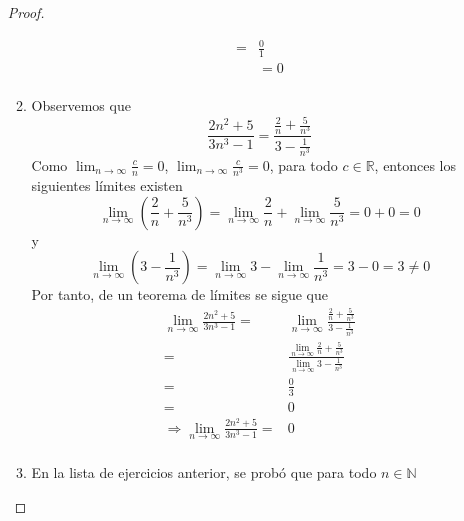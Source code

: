 \documentclass[12pt]{article}
\begin{document}
\begin{enumerate}
\begin{proof}
\begin{enumerate}
\begin{equation*}
\begin{split}
                        =&\frac{0}{1}\\
                        &=0\\
                    \end{split}
                \end{equation*}
                \item Observemos que
                \begin{equation*}
                    \frac{2n^2+5}{3n^3-1}=\frac{\frac{2}{n}+\frac{5}{n^3}}{3-\frac{1}{n^3}}
                \end{equation*}
                Como $\lim_{n\rightarrow\infty}\frac{c}{n}=0$, $\lim_{n\rightarrow\infty}\frac{c}{n^3}=0$, para todo $c\in\mathbb{R}$, entonces los siguientes límites existen
                \begin{equation*}
                    \lim_{n\rightarrow\infty}\left(\frac{2}{n}+\frac{5}{n^3}\right)=\lim_{n\rightarrow\infty}\frac{2}{n}+\lim_{n\rightarrow\infty}\frac{5}{n^3}=0+0=0
                \end{equation*}
                y
                \begin{equation*}
                    \lim_{n\rightarrow\infty}\left(3-\frac{1}{n^3}\right)=\lim_{n\rightarrow\infty}3-\lim_{n\rightarrow\infty}\frac{1}{n^3}=3-0=3\neq0
                \end{equation*}
                Por tanto, de un teorema de límites se sigue que
                \begin{equation*}
                    \begin{split}
                        \lim_{n\rightarrow\infty}\frac{2n^2+5}{3n^3-1}=&\lim_{n\rightarrow\infty}\frac{\frac{2}{n}+\frac{5}{n^3}}{3-\frac{1}{n^3}}\\
                        =&\frac{\lim_{n\rightarrow\infty}\frac{2}{n}+\frac{5}{n^3}}{\lim_{n\rightarrow\infty}3-\frac{1}{n^3}}\\
                        =&\frac{0}{3}\\
                        =&0\\
                        \Rightarrow \lim_{n\rightarrow\infty}\frac{2n^2+5}{3n^3-1}=&0\\
                    \end{split}
                \end{equation*}
                \item En la lista de ejercicios anterior, se probó que para todo $n\in\mathbb{N}$
                \begin{equation*}

\end{equation*}
\end{enumerate}
\end{proof}
\end{enumerate}
\end{document}
